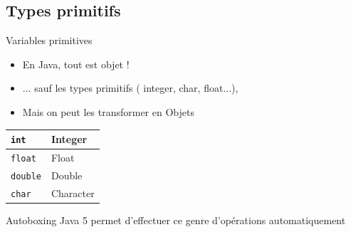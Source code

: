 \documentclass[handout]{beamer}
\begin{document}
\subsection{Types primitifs}
\begin{frame}

	\begin{block}{Variables primitives}
		\begin{itemize}
			\item En Java, tout est objet !
			\item ... sauf les types primitifs ( integer, char, float...),
			\item Mais on peut les transformer en Objets
		\end{itemize}
	\end{block}

	\begin{center}
		\begin{tabular}{|l|p{3cm}|}
			\hline
			\texttt{int} & Integer\\ \hline
			\texttt{float}  & Float \\ \hline
			\texttt{double} & Double \\ \hline
			\texttt{char} & Character \\ \hline
		\end{tabular}
	\end{center}
	\begin{block}{Autoboxing}
	 	Java 5 permet d'effectuer ce genre d'opérations automatiquement
	\end{block}

\end{frame}
\end{document}
